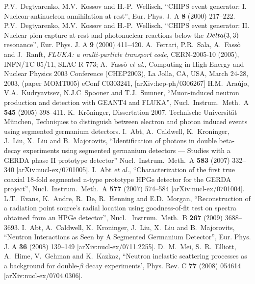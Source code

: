 \documentclass[article]{IEEEtran}
\begin{document}
\begin{thebibliography}{1}
P.V.~Degtyarenko, M.V.~Kossov and H.-P.~Wellisch,
``CHIPS event generator: I. Nucleon-antinucleon annihilation at rest'',
Eur. Phys. J. A \textbf{8} (2000) 217--222.
%
P.V.~Degtyarenko, M.V.~Kossov and H.-P.~Wellisch,
``CHIPS event generator: II. Nuclear pion capture at rest and photonuclear reactions below the ${\\Delta} (3,3)$ resonance'',
Eur. Phys. J. A \textbf{9} (2000) 411--420.
%
A.~Ferrari, P.R.~Sala, A.~Fass\`o and J.~Ranft,
\emph{FLUKA: a multi-particle transport code}, CERN-2005-10 (2005), INFN/TC-05/11, SLAC-R-773; A.~Fass\`o \emph{et al.},
Computing in High Energy and Nuclear Physics 2003 Conference (CHEP2003), La Jolla,
CA, USA, March 24-28, 2003, (paper MOMT005) eConf C0303241,
[arXiv:hep-ph/0306267]
%
H.M.~Ara\'{u}jo, V.A.~Kudryavtsev, N.J.C~Spooner and T.J.~Sumner,
``Muon-induced neutron production and detection with GEANT4 and FLUKA'',
Nucl.\ Instrum.\ Meth.\  A {\bf 545} (2005) 398--411.
%
K.~Kr\"oninger, Dissertation 2007, Technische Universit\"at M\"unchen,
Techniques to distinguish between electron and photon induced events using segmented germanium detectors.
%
  I.~Abt, A.~Caldwell, K.~Kroninger, J.~Liu, X.~Liu and B.~Majorovits,
``Identification of photons in double beta-decay experiments using segmented germanium detectors — Studies with a GERDA phase II prototype detector''
 Nucl.\ Instrum.\ Meth.\  A {\bf 583} (2007) 332--340 [arXiv:nucl-ex/0701005].
%
  I.~Abt {\it et al.},
``Characterization of the first true coaxial 18-fold segmented n-type prototype HPGe detector for the GERDA project'',
  Nucl.\ Instrum.\ Meth.\  A {\bf 577} (2007) 574--584
  [arXiv:nucl-ex/0701004].
%
%
L.T.~Evans, K.~Andre, R.~De, R.~Henning and E.D.~Morgan,
``Reconstruction of a radiation point source’s radial location using goodness-of-fit test on spectra obtained from an HPGe detector'',
Nucl. \ Instrum.\ Meth.\ B {\bf 267} (2009) 3688--3693.
%
  I.~Abt, A.~Caldwell, K.~Kroninger, J.~Liu, X.~Liu and B.~Majorovits,
``Neutron Interactions as Seen by A Segmented Germanium Detector'',
  Eur. Phys. J. A \textbf{36} (2008) 139--149 [arXiv:nucl-ex/0711.2255].
%
  D.~M.~Mei, S.~R.~Elliott, A.~Hime, V.~Gehman and K.~Kazkaz,
 ``Neutron inelastic scattering processes as a background for double-$\beta$ decay experiments',
  Phys. Rev. C \textbf{77} (2008) 054614 [arXiv:nucl-ex/0704.0306].

\end{thebibliography}
\end{document}
